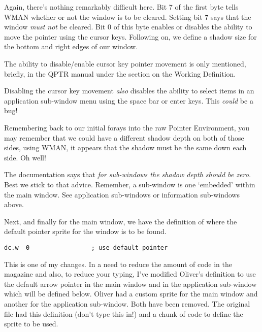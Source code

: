 Again, there's nothing remarkably difficult here. Bit 7 of the first
    byte tells WMAN whether or not the window is to be cleared. Setting bit 7
    says that the window \emph{must not} be cleared. Bit 0 of this byte enables or disables 
    the ability to move the pointer using the cursor keys. Following
    on, we define a shadow size for the bottom and right edges of our window.
    

\begin{note}
The ability to disable/enable cursor key pointer movement is only
      mentioned, briefly, in the QPTR manual under the section on the Working
      Definition.

Disabling the cursor key movement \emph{also}       disables the ability to select items in an application sub-{}window menu
      using the space bar or enter keys. This \emph{could} be a
      bug!
\end{note}

Remembering back to our initial forays into the raw Pointer
    Environment, you may remember that we could have a different shadow depth
    on both of those sides, using WMAN, it appears that the shadow must be the
    same down each side. Oh well!

\begin{note}
The documentation says that \emph{for sub-{}windows the shadow
      depth should be zero.} Best we stick to that advice. Remember,
      a sub-{}window is one `embedded' within the main window. See application
      sub-{}windows or information sub-{}windows above.
\end{note}

Next, and finally for the main window, we have the definition of
    where the default pointer sprite for the window is to be found.

\begin{lstlisting}[firstnumber=last,caption={Main Window - Default Pointer}]
           dc.w  0                 ; use default pointer
\end{lstlisting}

This is one of my changes. In a need to reduce the amount of code in
    the magazine and also, to reduce your typing, I've modified Oliver's
    definition to use the default arrow pointer in the main window and in the
    application sub-{}window which will be defined below. Oliver had a custom
    sprite for the main window and another for the application sub-{}window.
    Both have been removed. The original file had this definition (don't type
    this in!) and a chunk of code to define the sprite to be used.

